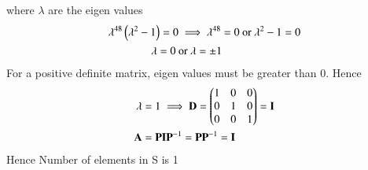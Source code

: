 \documentclass[journal]{IEEEtran}
\begin{document}
where $\lambda$ are the eigen values
\begin{align}
    \lambda^{48}\left(\lambda^2-1\right)=0&\implies
    \lambda^{48}=0\ \text{or}\ \lambda^{2}-1=0 \\
     \lambda=0\ &\text{or}\ \lambda=\pm1
\end{align}
For a positive definite matrix, eigen values must be greater than 0. Hence
\begin{align}
    \lambda&=1 \implies
    \mathbf{D}=\begin{pmatrix}1&0&0\\0&1&0\\0&0&1\end{pmatrix}=\mathbf{I}\\
    \mathbf{A}&=\mathbf{P}\mathbf{I}\mathbf{P}^{-1}
    =\mathbf{P}\mathbf{P}^{-1}=\mathbf{I}
\end{align}
Hence Number of elements in S is 1
\end{document}
